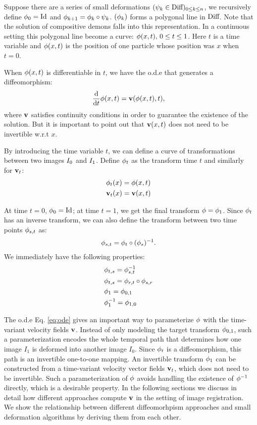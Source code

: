 \documentclass[letterpaper,12pt]{article}
\begin{document}
Suppose there are a series of small deformations $(\psi_k \in \text{Diff})_{0 \leq k \leq n}$, we recursively define $\phi_0 = \text{Id}$ and $\phi_{k+1} = \phi_{k} \circ \psi_{k}$.  $(\phi_{k})$ forms a polygonal line in $\text{Diff}$. Note that the solution of compositive demons falls into this representation. In a continuous setting this polygonal line become a curve: $\phi(x, t), \, 0 \leq t \leq 1$. Here $t$ is a time variable and $\phi(x, t)$ is the position of one particle whose position was $x$ when $t=0$.

When $\phi(x, t)$ is differentiable in $t$, we have the o.d.e that generates a diffeomorphism:
\begin{align}
\frac{\text{d}}{\text{d} t} \phi(x, t) = \mathbf{v}(\phi(x, t), t), 
\label{eq:ode}
\end{align}
where $\mathbf{v}$ satisfies continuity conditions in order to guarantee the
existence of the solution. But it is important to point out that
$\mathbf{v}(x,t)$ does not need to be invertible w.r.t $x$.

By introducing the time variable $t$, we can define a curve of transformations between two images $I_0$ and $I_1$. Define $\phi_t$ as the transform time $t$ and similarly for $\mathbf{v}_t$:
\begin{align}
& \phi_t(x) = \phi(x, t) \\
& \mathbf{v}_t(x) = \mathbf{v}(x, t) \\
\end{align}

At time $t=0$, $\phi_0 = \text{Id}$; at time $t=1$, we get the final
transform $\phi = \phi_1$. Since $\phi_t$ has an inverse transform, we can also define the transform between two time points $\phi_{s,t}$ as:
\begin{align}
\phi_{s,t} = \phi_t \circ (\phi_s)^{-1}.
\end{align}
We immediately have the following properties:
\begin{align}
& \phi_{t, s} = \phi_{s, t}^{-1} \\
& \phi_{t, s} = \phi_{r, t} \circ \phi_{s, r} \\
& \phi_1 = \phi_{0, 1} \\
& \phi_1^{-1} = \phi_{1, 0}
\label{eq:invphi}
\end{align}

The o.d.e Eq. \ref{eq:ode} gives an important way to parameterize
$\phi$ with the time-variant velocity fields $\mathbf{v}$. Instead of only
modeling the target transform $\phi_{0,1}$, such a parameterization
encodes the whole temporal path that determines how one image $I_1$ is
deformed into another image $I_0$. Since $\phi_t$ is a
diffeomorphism, this path is an invertible one-to-one mapping. An
invertible transform $\phi_1$ can be constructed from a time-variant
velocity vector fields $\mathbf{v}_t$, which does not need to be
invertible. Such a parameterization of $\phi$ avoids handling the existence of $\phi^{-1}$ directly, which is a desirable property. In the following sections we discuss in detail how different approaches compute $\mathbf{v}$ in the setting of image registration. We show the relationship between different diffeomorhpism approaches and small deformation algorithms by deriving them from each other.
\end{document}
